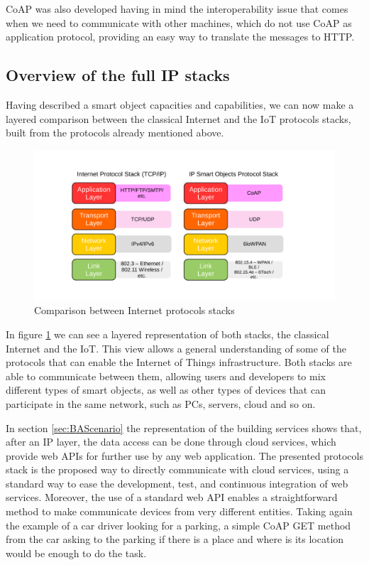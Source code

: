 CoAP was also developed having in mind the interoperability issue that comes when we need to communicate with other machines, which do not use CoAP as application protocol, providing an easy way to translate the messages to HTTP.

\subsection{Overview of the full IP stacks}
Having described a smart object capacities and capabilities, we can now make a layered comparison between the classical Internet and the IoT protocols stacks, built from the protocols already mentioned above.

\begin{figure}[htb]
	\centering
	\includegraphics[width=1\columnwidth]{chapters/background.images/Layers.pdf}
	\caption{Comparison between Internet protocols stacks}
	\label{fig:IPLayers}
\end{figure}

In figure \ref{fig:IPLayers} we can see a layered representation of both stacks, the classical Internet and the IoT.
This view allows a general understanding of some of the protocols that can enable the Internet of Things infrastructure.
Both stacks are able to communicate between them, allowing users and developers to mix different types of smart objects, as well as other types of devices that can participate in the same network, such as PCs, servers, cloud and so on.

In section \ref{sec:BAScenario} the representation of the building services shows that, after an IP layer, the data access can be done through cloud services, which provide web APIs for further use by any web application.
The presented protocols stack is the proposed way to directly communicate with cloud services, using a standard way to ease the development, test, and continuous integration of web services.
Moreover, the use of a standard web API enables a straightforward method to make communicate devices from very different entities.
Taking again the example of a car driver looking for a parking, a simple CoAP GET method from the car asking to the parking if there is a place and where is its location would be enough to do the task.

